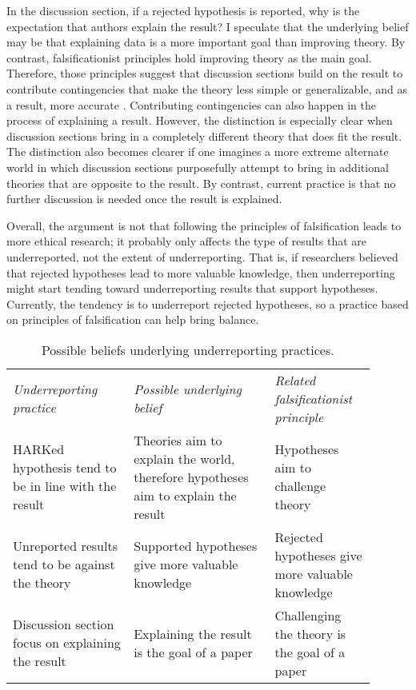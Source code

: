 \documentclass[empirical, authordate, meta]{jote-new-article}
\begin{document}
In the discussion section, if a rejected hypothesis is reported, why is the expectation that authors explain the result? I speculate that the underlying belief may be that explaining data is a more important goal than improving theory. By contrast, falsificationist principles hold improving theory as the main goal. Therefore, those principles suggest that discussion sections build on the result to contribute contingencies that make the theory less simple or generalizable, and as a result, more accurate \parencite[eg,]{Lakatos1970, Cross1982}. Contributing contingencies can also happen in the process of explaining a result. However, the distinction is especially clear when discussion sections bring in a completely different theory that does fit the result. The distinction also becomes clearer if one imagines a more extreme alternate world in which discussion sections purposefully attempt to bring in additional theories that are opposite to the result. By contrast, current practice is that no further discussion is needed once the result is explained.

Overall, the argument is not that following the principles of falsification leads to more ethical research; it probably only affects the type of results that are underreported, not the extent of underreporting. That is, if researchers believed that rejected hypotheses lead to more valuable knowledge, then underreporting might start tending toward underreporting results that support hypotheses. Currently, the tendency is to underreport rejected hypotheses, so a practice based on principles of falsification can help bring balance.


\begin{table}[t!] 
\begin{fullwidth}

\caption{Possible beliefs underlying underreporting practices.}
\label{tab:1}
  
\begin{tabularx}{\columnwidth}{@{}>{\raggedright\arraybackslash}p{0.3\linewidth} >{\raggedright\arraybackslash}p{0.35\linewidth} >{\raggedright\arraybackslash}p{0.25\linewidth}@{}}

  \emph{Underreporting practice} & 
  \emph{Possible underlying belief} & \emph{Related falsificationist principle}\\
HARKed hypothesis tend to be in line with the result & Theories aim to explain the world, therefore hypotheses aim to explain the result & Hypotheses aim to challenge theory\\
Unreported results tend to be against the theory  & Supported hypotheses give more valuable knowledge & Rejected hypotheses give more valuable knowledge\\
Discussion section focus on explaining the result & Explaining the result is the goal of a paper & Challenging the theory is the goal of a paper\\


\end{tabularx}
\end{fullwidth}


\end{table}
\end{document}
